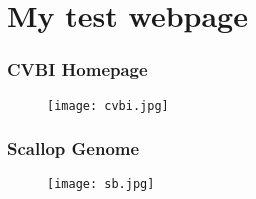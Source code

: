 \documentclass[notheorems,mathserif,table,compress]{beamer}  %
\begin{document}
\section{My test webpage}
\begin{frame}
 \frametitle{CVBI Homepage}
 	\begin{figure}[!ht]
	\centering\texttt{[image: cvbi.jpg]}
	\end{figure}
\end{frame}
\begin{frame}
 \frametitle{Scallop Genome}
 	\begin{figure}[!ht]
	\centering\texttt{[image: sb.jpg]}
	\end{figure}
\end{frame}
\end{document}
